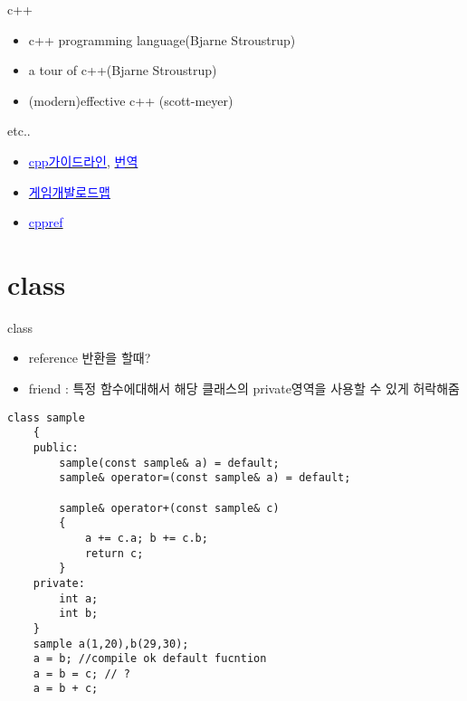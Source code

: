\documentclass[10pt]{beamer}
\begin{document}
\begin{frame}{c++}
    \begin{itemize}
        \item c++ programming language(Bjarne Stroustrup)
        \item a tour of c++(Bjarne Stroustrup)
        \item (modern)effective c++ (scott-meyer)
    \end{itemize}
    etc..

    \begin{itemize}
        \item \href{https://github.com/isocpp/CppCoreGuidelines/blob/master/CppCoreGuidelines.md}{\textcolor{blue}{cpp가이드라인}},
        \href{https://github.com/CppKorea/CppCoreGuidelines}{\textcolor{blue}{번역}}
        \item \href{https://github.com/utilForever/game-developer-roadmap}{\textcolor{blue}{게임개발로드맵}}
        \item \href{https://en.cppreference.com/w/}{\textcolor{blue}{cppref}}
    \end{itemize}
\end{frame}


\section{class}


\begin{frame}{class}
    \begin{itemize}
        \item reference 반환을 할때?
        \item friend : 특정 함수에대해서 해당 클래스의 private영역을 사용할 수 있게 허락해줌
    \end{itemize}
\end{frame}



\begin{frame}[fragile]{ex}
    \begin{lstlisting}[style = CppStyle]
    class sample
    {
    public: 
        sample(const sample& a) = default;
        sample& operator=(const sample& a) = default;
        
        sample& operator+(const sample& c)
        { 
            a += c.a; b += c.b;
            return c;
        }
    private:
        int a;
        int b; 
    }
    sample a(1,20),b(29,30);
    a = b; //compile ok default fucntion
    a = b = c; // ?
    a = b + c;
    \end{lstlisting}
\end{frame}    
\end{document}
